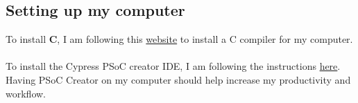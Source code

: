 \documentclass[12pt,twoside]{article}
\begin{document}
\subsection{Setting up my computer}
To install {\bf C}, I am following this \href{https://en.wikibooks.org/wiki/C_Programming/What_you_need_before_you_can_learn}{website} to install a C compiler for my computer. 
\\
\\ To install the Cypress PSoC creator IDE, I am following the instructions \href{http://www.cypress.com/products/psoc-software}{here}. Having PSoC Creator on my computer should help increase my productivity and workflow. 
\end{document}
